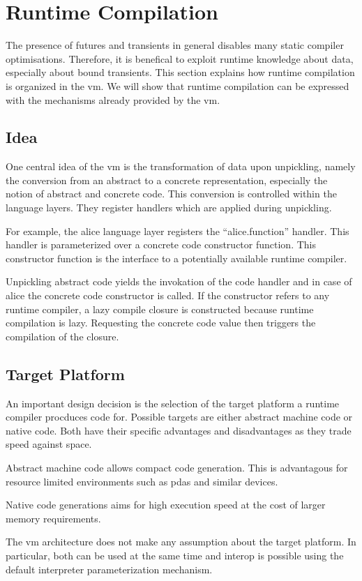 \section{Runtime Compilation}
The presence of futures and transients in general disables many static compiler
optimisations. Therefore, it is benefical to exploit runtime knowledge about
data, especially about bound transients.
This section explains how runtime compilation is organized in the vm.
We will show that runtime compilation can be expressed
with the mechanisms already provided by the vm.
\subsection{Idea}
One central idea of the vm is the transformation of data upon unpickling,
namely the conversion from an abstract to a concrete representation,
especially the notion of abstract and concrete code.
This conversion is controlled within the language layers. They register
handlers which are applied during unpickling.

For example, the alice language layer registers the ``alice.function''
handler. This handler is parameterized over a concrete code constructor
function. This constructor function is the interface to a potentially available
runtime compiler.

Unpickling abstract code yields the invokation of the code handler and
in case of alice the concrete code constructor is called. If the constructor
refers to any runtime compiler, a lazy compile closure is constructed
because runtime compilation is lazy.
Requesting the concrete code value then triggers the compilation of the closure.
\subsection{Target Platform}
An important design decision is the selection of the target platform
a runtime compiler procduces code for.
Possible targets are either abstract machine code or native code.
Both have their specific advantages and disadvantages as they trade
speed against space.

Abstract machine code allows compact code generation. This is advantagous
for resource limited environments such as pdas and similar devices.

Native code generations aims for high execution speed at the cost of larger
memory requirements.

The vm architecture does not make any assumption about the target platform.
In particular, both can be used at the same time and interop is possible
using the default interpreter parameterization mechanism.
